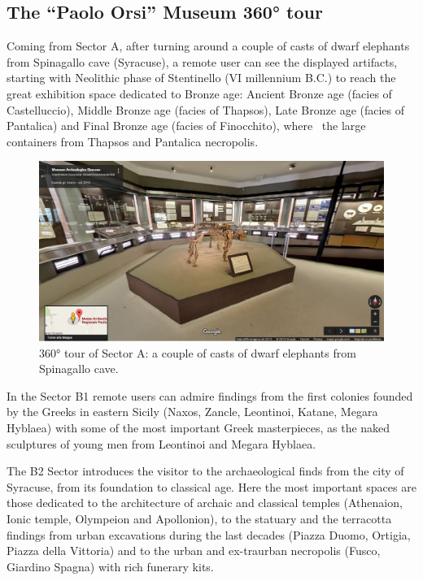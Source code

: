\documentclass[amsthm,ebook]{saparticle}
\begin{document}
\subsection{The ``Paolo Orsi'' Museum 360° tour}


\noindent Coming from Sector A, after turning around a couple of casts of dwarf elephants from Spinagallo cave (Syracuse), a
remote user can see the displayed artifacts, starting with Neolithic phase of Stentinello (VI millennium B.C.) to reach
the great exhibition space dedicated to Bronze age: Ancient Bronze age (facies of Castelluccio), Middle Bronze age
(facies of Thapsos), Late Bronze age (facies of Pantalica) and Final Bronze age (facies of Finocchito), where \ the
large containers from Thapsos and Pantalica necropolis.

\begin{figure}[!bp]
\centering
 \includegraphics[width=\columnwidth]{EAGLE2016BONACINIPilotprojectatPaoloOrsiMuseum-img002.jpg}
\caption{360° tour of Sector A: a couple of casts of dwarf elephants from Spinagallo cave. }
\label{fig:2}
\end{figure}


In the Sector B1 remote users can admire findings from the first colonies founded by the Greeks in eastern Sicily
(Naxos, Zancle, Leontinoi, Katane, Megara Hyblaea) with some of the most important Greek masterpieces, as the naked
sculptures of young men from Leontinoi and Megara Hyblaea.

The B2 Sector introduces the visitor to the archaeological finds from the city of Syracuse, from its foundation to
classical age. Here the most important spaces are those dedicated to the architecture of archaic and classical temples
(Athenaion, Ionic temple, Olympeion and Apollonion), to the statuary and the terracotta findings from urban excavations
during the last decades (Piazza Duomo, Ortigia, Piazza della Vittoria) and to the urban and ex-traurban necropolis
(Fusco, Giardino Spagna) with rich funerary kits. \ 
\end{document}
